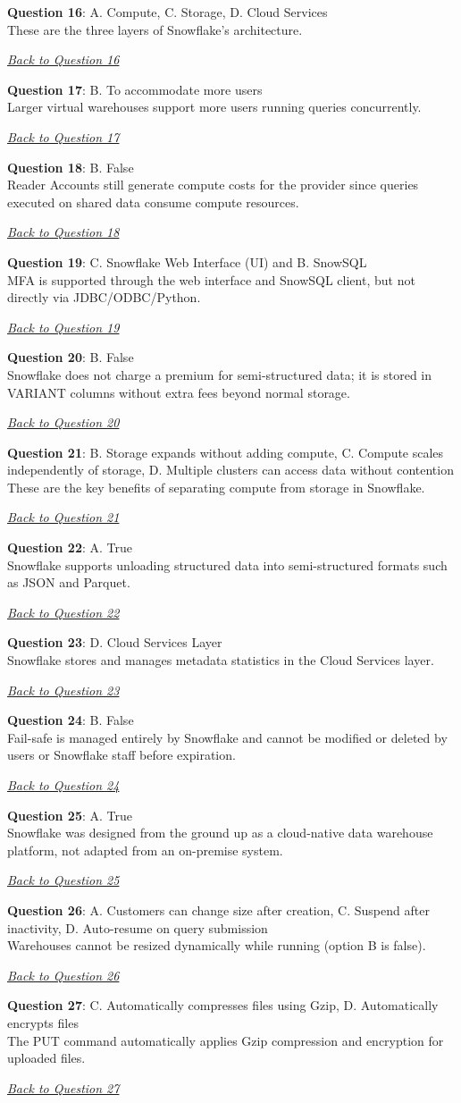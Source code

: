 \documentclass[12pt]{article}
\newcommand{\answer}[2]{%
  \textbf{Question #1}\label{ans:#1}: #2\par
  \smallskip\emph{\hyperref[q:#1]{Back to Question #1}}\par\medskip
}
\begin{document}
\answer{16}{A. Compute, C. Storage, D. Cloud Services\\
These are the three layers of Snowflake’s architecture.}

\answer{17}{B. To accommodate more users\\
Larger virtual warehouses support more users running queries concurrently.}

\answer{18}{B. False\\
Reader Accounts still generate compute costs for the provider since queries executed on shared data consume compute resources.}

\answer{19}{C. Snowflake Web Interface (UI) and B. SnowSQL\\
MFA is supported through the web interface and SnowSQL client, but not directly via JDBC/ODBC/Python.}

\answer{20}{B. False\\
Snowflake does not charge a premium for semi-structured data; it is stored in VARIANT columns without extra fees beyond normal storage.}

\answer{21}{B. Storage expands without adding compute, C. Compute scales independently of storage, D. Multiple clusters can access data without contention\\
These are the key benefits of separating compute from storage in Snowflake.}

\answer{22}{A. True\\
Snowflake supports unloading structured data into semi-structured formats such as JSON and Parquet.}

\answer{23}{D. Cloud Services Layer\\
Snowflake stores and manages metadata statistics in the Cloud Services layer.}

\answer{24}{B. False\\
Fail-safe is managed entirely by Snowflake and cannot be modified or deleted by users or Snowflake staff before expiration.}

\answer{25}{A. True\\
Snowflake was designed from the ground up as a cloud-native data warehouse platform, not adapted from an on-premise system.}

\answer{26}{A. Customers can change size after creation, C. Suspend after inactivity, D. Auto-resume on query submission\\
Warehouses cannot be resized dynamically while running (option B is false).}

\answer{27}{C. Automatically compresses files using Gzip, D. Automatically encrypts files\\
The PUT command automatically applies Gzip compression and encryption for uploaded files.}
\end{document}
